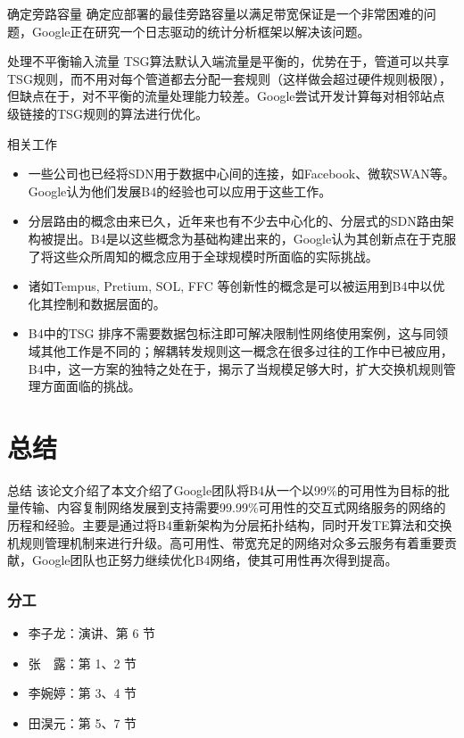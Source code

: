 \begin{frame}{确定旁路容量}
    确定应部署的最佳旁路容量以满足带宽保证是一个非常困难的问题，Google正在研究一个日志驱动的统计分析框架以解决该问题。
\end{frame}

\begin{frame}{处理不平衡输入流量}
    TSG算法默认入端流量是平衡的，优势在于，管道可以共享TSG规则，而不用对每个管道都去分配一套规则（这样做会超过硬件规则极限），但缺点在于，对不平衡的流量处理能力较差。Google尝试开发计算每对相邻站点级链接的TSG规则的算法进行优化。
\end{frame}

\begin{frame}{相关工作}
    \begin{itemize}[<+->]
        \item {}  一些公司也已经将SDN用于数据中心间的连接，如Facebook、微软SWAN等。Google认为他们发展B4的经验也可以应用于这些工作。

        \item {} 分层路由的概念由来已久，近年来也有不少去中心化的、分层式的SDN路由架构被提出。B4是以这些概念为基础构建出来的，Google认为其创新点在于克服了将这些众所周知的概念应用于全球规模时所面临的实际挑战。

        \item {} 诸如Tempus, Pretium, SOL, FFC 等创新性的概念是可以被运用到B4中以优化其控制和数据层面的。

        \item {} B4中的TSG 排序不需要数据包标注即可解决限制性网络使用案例，这与同领域其他工作是不同的；解耦转发规则这一概念在很多过往的工作中已被应用，B4中，这一方案的独特之处在于，揭示了当规模足够大时，扩大交换机规则管理方面面临的挑战。
    \end{itemize}

\end{frame}

\section{总结}
\begin{frame}{总结}
    该论文介绍了本文介绍了Google团队将B4从一个以\alert{99\%}的可用性为目标的批量传输、内容复制网络发展到支持需要\alert{99.99\%}可用性的交互式网络服务的网络的历程和经验。主要是通过将B4重新架构为分层拓扑结构，同时开发TE算法和交换机规则管理机制来进行升级。高可用性、带宽充足的网络对众多云服务有着重要贡献，Google团队也正努力继续优化B4网络，使其可用性再次得到提高。
\end{frame}

\begin{frame}[plain]
    \frametitle{分工}
    \begin{itemize}
        \item 李子龙：演讲、第 6 节
        \item 张　露：第 1、2 节
        \item 李婉婷：第 3、4 节
        \item 田淏元：第 5、7 节
    \end{itemize}
\end{frame}

\makebottom[min]
